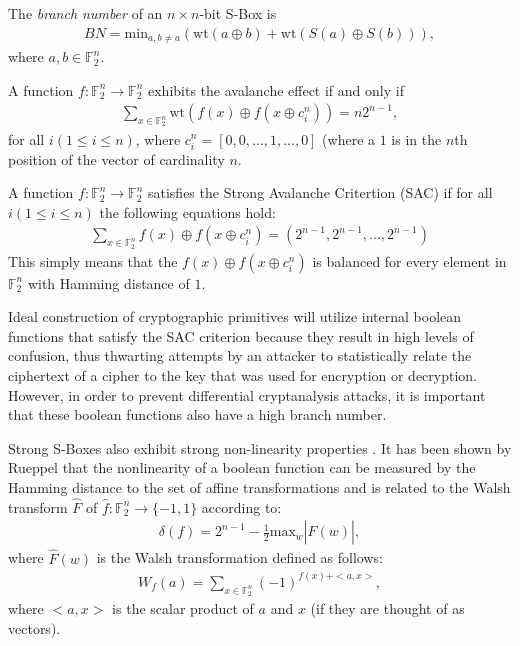\documentclass[11pt]{article}
\newcommand{\field}[1]{\mathbb{#1}} %
\begin{document}
\begin{define}
The \emph{branch number} of an $n \times n$-bit S-Box is
\begin{eqnarray*}
BN = \text{min}_{a, b\not=a}(\text{wt}(a \oplus b) + \text{wt}(S(a) \oplus S(b))),
\end{eqnarray*}
where $a, b \in \field{F}_2^n$.
\end{define}

\begin{define}
A function $f : \field{F}_2^n \to \field{F}_2^n$ exhibits the avalanche effect if and only if 
\begin{eqnarray*}
\sum_{x \in \field{F}_2^n} \text{wt}(f(x) \oplus f(x \oplus c_{i}^{n})) = n2^{n-1},
\end{eqnarray*}
for all $i (1 \leq i \leq n)$, where $c_{i}^{n} = [0, 0, ..., 1, ..., 0]$ (where a $1$ is in the $n$th position of the vector of cardinality $n$.
\end{define}

\begin{define}
A function $f : \field{F}_2^n \to \field{F}_2^n$ satisfies the Strong Avalanche Critertion (SAC) if for all $i (1 \leq i \leq n)$ the following equations hold:
\begin{eqnarray*}
\sum_{x \in \field{F}_2^n} f(x) \oplus f(x \oplus c_i^n) = (2^{n-1}, 2^{n-1}, ..., 2^{n-1})
\end{eqnarray*}
This simply means that the $f(x) \oplus f(x \oplus c_i^n)$ is balanced for every element in $\field{F}_2^n$ with Hamming distance of $1$. 
\end{define}

Ideal construction of cryptographic primitives will utilize internal boolean functions that satisfy the SAC criterion because they result in high levels of confusion, thus thwarting attempts by an attacker to statistically relate the ciphertext of a cipher to the key that was used for encryption or decryption. However, in order to prevent differential cryptanalysis attacks, it is important that these boolean functions also have a high branch number.

Strong S-Boxes also exhibit strong non-linearity properties \cite{Kim90astudy}. It has been shown by Rueppel that the nonlinearity of a boolean function can be measured by the Hamming distance to the set of affine transformations and is related to the Walsh transform $\hat{F}$ of $\hat{f} : \field{F}_2^n \to \{-1, 1\}$ according to:
\begin{eqnarray*}
\delta(f)  = 2^{n-1} - \frac{1}{2}\text{max}_w|\hat{F}(w)|,
\end{eqnarray*}
where $\hat{F}(w)$ is the Walsh transformation defined as follows:
\begin{eqnarray*}
W_f(a) = \sum_{x \in \field{F}_2^n} (-1)^{f(x) + <a,x>},
\end{eqnarray*}
where $<a,x>$ is the scalar product of $a$ and $x$ (if they are thought of as vectors).
\end{document}
